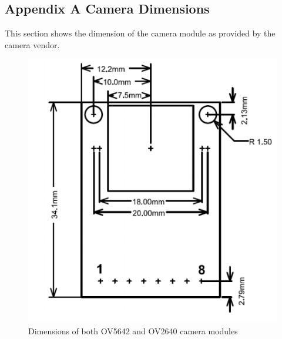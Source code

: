 \begin{appendices}
\section*{Appendix A Camera Dimensions}
This section shows the dimension of the camera module as provided by the camera vendor.

\begin{figure}[!htbp]
\centering
\includegraphics[width = 0.75 \linewidth]{pics/arducam_mech}
\caption{Dimensions of both OV5642 and OV2640 camera modules}
\label{fig:arducam_mech}
\end{figure}

\end{appendices}